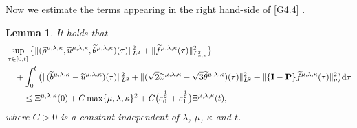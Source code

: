 \documentclass[reqno,11pt]{amsart}
\theoremstyle{plain}
\newtheorem{lem}[thm]{Lemma}
\numberwithin{equation}{section}
\newcommand{\eps}{{\varepsilon}}
\begin{document}
Now we estimate the terms appearing in the right hand-side of \eqref{G4.4} .
\begin{lem}\label{L4.1}
It holds that
\begin{align}\label{G4.7}
&\sup_{\tau\in[0,t]}\big\{\|(\widetilde{\rho}^{\mu,\lambda,\kappa},\widetilde{u}^{\mu,\lambda,\kappa},
\widetilde{\theta}^{\mu,\lambda,\kappa})(\tau)\|_{L^2}^2
+\|\widetilde{f}^{\mu,\lambda,\kappa}(\tau)\|_{L_{x,v}^2}^2\big\}   \nonumber\\
&\quad +\int_{0}^t\big( \|(\widetilde{b}^{\mu,\lambda,\kappa}-\widetilde{u}^{\mu,\lambda,\kappa})(\tau)\|_{L^2}^2 +\|(\sqrt{2}\widetilde{\omega}^{\mu,\lambda,\kappa}-\sqrt{3}\widetilde{\theta}^{\mu,\lambda,\kappa})(\tau)\|_{L^2}^2+\|  \{\mathbf{I}-\mathbf{P}\}\widetilde{f}^{\mu,\lambda,\kappa}(\tau)\|_{\nu}^2 \big) {\rm d}\tau \nonumber\\
&\quad\quad \leq {\Xi} ^{\mu,\lambda,\kappa}(0)+C\max\{\mu,\lambda,\kappa\}^2+C \big(\eps_0^\frac{1}{2}  +\eps_1^\frac{1}{2}\big){\Xi} ^{\mu,\lambda,\kappa}(t),
\end{align}
where $C>0$ is a constant independent of  $\lambda$, $\mu$,  $\kappa$ and   $t$.
\end{lem}
\end{document}
